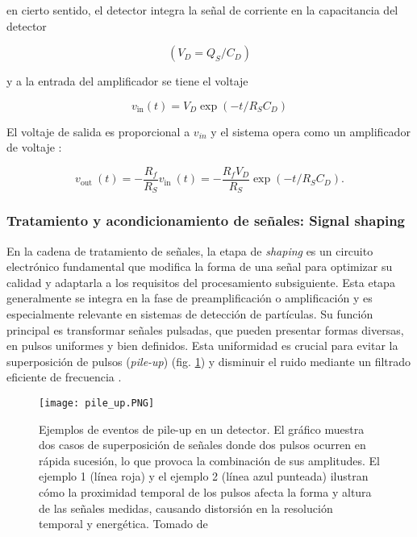 \documentclass{report}
\begin{document}
en cierto sentido, el detector integra la señal de corriente en la capacitancia del detector 

\begin{equation}
    \left(V_D=Q_S / C_D\right) 
\end{equation}

y a la entrada del amplificador se tiene el voltaje 

\begin{equation}
    v_{\text{in}}(t)=V_D \exp \left(-t / R_S C_D\right)
\end{equation}

\noindent El voltaje de salida es proporcional a $v_{i n}$ y el sistema opera como un amplificador de voltaje \cite{kolanoski6}:


\begin{equation}
    v_{\text {out }}(t)=-\frac{R_f}{R_S} v_{\text {in }}(t)=-\frac{R_f V_D}{R_S} \exp \left(-t / R_S C_D\right) .
\end{equation}


\subsubsection{Tratamiento y acondicionamiento de señales: Signal shaping}

\noindent En la cadena de tratamiento de señales, la etapa de \textit{shaping} es un circuito electrónico fundamental que modifica la forma de una señal para optimizar su calidad y adaptarla a los requisitos del procesamiento subsiguiente. Esta etapa generalmente se integra en la fase de preamplificación o amplificación y es especialmente relevante en sistemas de detección de partículas. Su función principal es transformar señales pulsadas, que pueden presentar formas diversas, en pulsos uniformes y bien definidos. Esta uniformidad es crucial para evitar la superposición de pulsos (\textit{pile-up}) (fig. \ref{fig:pile_up}) y disminuir el ruido mediante un filtrado eficiente de frecuencia \cite{leo1994techniques}.

\begin{figure}[H]
    \centering
    \texttt{[image: pile\_up.PNG]}
    \caption{Ejemplos de eventos de pile-up en un detector. El gráfico muestra dos casos de superposición de señales donde dos pulsos ocurren en rápida sucesión, lo que provoca la combinación de sus amplitudes. El ejemplo 1 (línea roja) y el ejemplo 2 (línea azul punteada) ilustran cómo la proximidad temporal de los pulsos afecta la forma y altura de las señales medidas, causando distorsión en la resolución temporal y energética. Tomado de \cite{luo2018pulse}}
    \label{fig:pile_up}
\end{figure}
\end{document}
